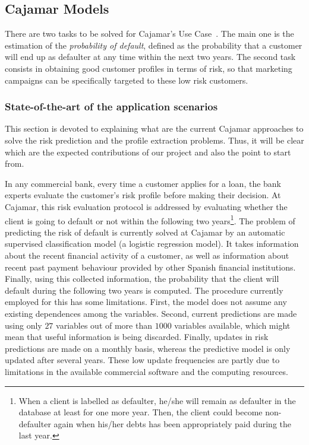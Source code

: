 
\newpage
\newpage
\newcommand{\X}{\mathbf{X}}
\newcommand{\Y}{\mathbf{Y}}
\newcommand{\Z}{\mathbf{Z}}
\newcommand{\x}{\mathbf{x}}
\newcommand{\y}{\mathbf{y}}
\newcommand{\z}{\mathbf{z}}
\newcommand{\argmax}[1]{\underset{#1}{\operatorname{arg}\,\operatorname{max}}\;}


\subsection{Cajamar Models}\label{Section:CajamarModels}
\label{Section:CajaMarModels}

There are two tasks to be solved for Cajamar's Use Case~\cite{Fer14b}. The main one is the estimation of the \emph{probability of default}, defined as the probability that a customer will end up as defaulter at any time within the next two years. The second task consists in obtaining good customer profiles in terms of risk, so that marketing campaigns can be specifically targeted to these low risk customers. 

\subsubsection{State-of-the-art of the application scenarios} \label{SubSection:}

This section is devoted to explaining what are the current Cajamar approaches to solve the risk prediction and the profile extraction problems. Thus, it will be clear which are the expected contributions of our project and also the point to start from.

In any commercial bank, every time a customer applies for a loan, the bank experts evaluate the customer's risk profile before making their decision. At Cajamar, this risk evaluation protocol is addressed by evaluating whether the client is going to default or not within the following two years\footnote{When a client is labelled as defaulter, he/she will remain as defaulter in the database at least for one more year. Then, the client could become non-defaulter again when his/her debts has been appropriately paid during the last year.}. The problem of predicting the risk of default is currently solved at Cajamar by an automatic supervised classification model (a logistic regression model). It takes information about the recent financial activity of a customer, as well as information about recent past payment behaviour provided by other Spanish financial institutions. Finally, using this collected information, the probability that the client will default during the following two years is computed. The procedure currently employed for this has some limitations. First, the model does not assume any existing dependences among the variables. Second, current predictions are made using only $27$ variables out of more than $1000$ variables available, which might mean that useful information is being discarded. Finally, updates in risk predictions are made on a monthly basis, whereas the predictive model is only updated after several years. These low update frequencies are partly due to limitations in the available commercial software and the computing resources.

